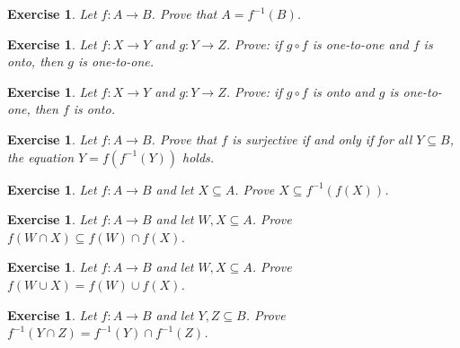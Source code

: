 \documentclass{book}
\newcounter{ekcounter}%
\theoremstyle{ekimcustom}
\newtheorem{exercise}[ekcounter]{Exercise}
\begin{document}
\begin{exercise}
Let $f : A \to B$. Prove that $A=f^{-1}(B)$.%
\end{exercise}

\begin{exercise}
Let $f : X \to Y$ and $g : Y \to Z$. Prove: if $g \circ f$ is one-to-one and $f$ is onto, then $g$ is one-to-one.%
\end{exercise}

\begin{exercise}
Let $f : X \to Y$ and $g : Y \to Z$. Prove: if $g \circ f$ is onto and $g$ is one-to-one, then $f$ is onto.%
\end{exercise}

\begin{exercise}
Let $f : A \to B$. Prove that $f$ is surjective if and only if for all $Y \subseteq B$, the equation $Y = f(f^{-1}(Y))$ holds. %
\end{exercise}

\begin{exercise}
Let $f : A \to B$ and let $X \subseteq A$. Prove $X \subseteq f^{-1}(f(X))$.%
\end{exercise}

\begin{exercise}
Let $f : A \to B$ and let $W,X \subseteq A$. Prove $f(W \cap X) \subseteq f(W) \cap f(X)$. %
\end{exercise}

\begin{exercise}
Let $f : A \to B$ and let $W,X \subseteq A$. Prove $f(W \cup X) = f(W) \cup f(X)$.%
\end{exercise}


\begin{exercise}
Let $f : A \to B$ and let $Y, Z \subseteq B$. Prove $f^{-1}(Y \cap Z) = f^{-1}(Y) \cap f^{-1}(Z)$. %
\end{exercise}
\end{document}
